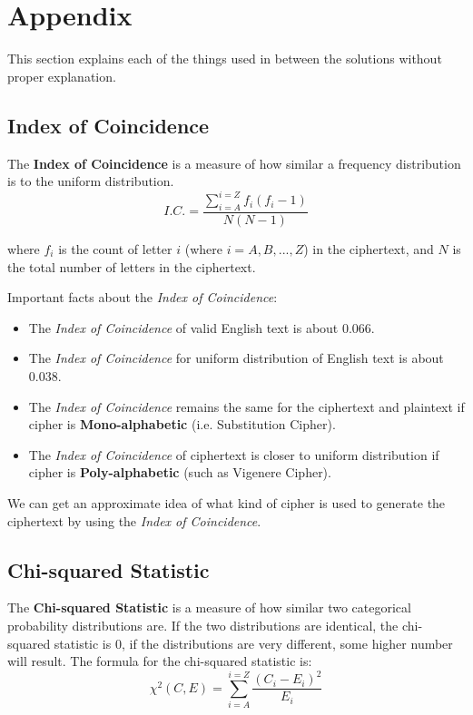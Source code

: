\documentclass[10pt,twoside]{article}
\begin{document}
\newpage
\section{Appendix}

This section explains each of the things used in between the solutions without proper explanation.

\subsection{Index of Coincidence} \label{ic}

The \textbf{Index of Coincidence} is a measure of how similar a frequency distribution is to the uniform distribution.
$$ I.C. = \frac{\sum_{i=A}^{i=Z} f_i(f_i-1)}{N(N-1)}$$

where $f_i$ is the count of letter $i$ (where $i = A,B,...,Z$) in the ciphertext, and $N$ is the total number of letters in the ciphertext. \newline

Important facts about the \textit{Index of Coincidence}:
\begin{itemize}
  \setlength\itemsep{0em}
    \item The \textit{Index of Coincidence} of valid English text is about $0.066$.
    \item The \textit{Index of Coincidence} for uniform distribution of English text is about $0.038$.
    \item The \textit{Index of Coincidence} remains the same for the ciphertext and plaintext if cipher is \textbf{Mono-alphabetic} (i.e. Substitution Cipher).
    \item The \textit{Index of Coincidence} of ciphertext is closer to uniform distribution if cipher is \textbf{Poly-alphabetic} (such as Vigenere Cipher).
\end{itemize}

We can get an approximate idea of what kind of cipher is used to generate the ciphertext by using the \textit{Index of Coincidence}.

\subsection{Chi-squared Statistic} \label{chi}
The \textbf{Chi-squared Statistic} is a measure of how similar two categorical probability distributions are. If the two distributions are identical, the chi-squared statistic is 0, if the distributions are very different, some higher number will result. The formula for the chi-squared statistic is:
$$\chi^2(C,E) = \sum_{i=A}^{i=Z}\frac{(C_i-E_i)^2}{E_i}$$
\end{document}
